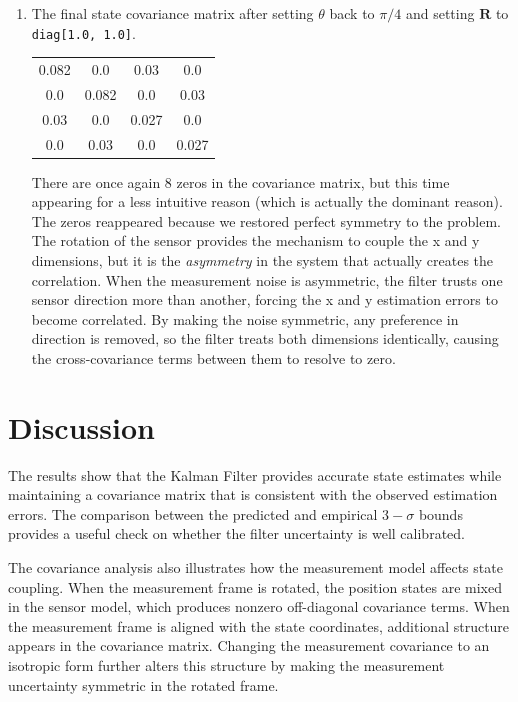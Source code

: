 \documentclass[11pt, letterpaper, twocolumn]{article}
\begin{document}
\begin{enumerate}
\item The final state covariance matrix after setting $\theta$ back 
    to $\pi/4$ and setting $\bm{R}$ to \texttt{diag[1.0, 1.0]}. 

    \begin{center}
        \begin{tabular}{cccc}
            \hline
            0.082 & 0.0 & 0.03 & 0.0 \\
            0.0 & 0.082 & 0.0 & 0.03 \\
            0.03 & 0.0 & 0.027 & 0.0 \\
            0.0 & 0.03 & 0.0 & 0.027 \\
            \hline
        \end{tabular}
    \end{center}
    There are once again 8 zeros in the covariance matrix, but this time
    appearing for a less intuitive reason (which is actually the dominant
    reason). The zeros reappeared because we restored perfect symmetry to 
    the problem. The rotation of the sensor provides the mechanism to
    couple the x and y dimensions, but it is the \textit{asymmetry} in the
    system that actually creates the correlation. When the measurement noise 
    is asymmetric, the filter trusts one sensor direction more than another,
    forcing the x and y estimation errors to become correlated. By making the
    noise symmetric, any preference in direction is removed, so the filter
    treats both dimensions identically, causing the cross-covariance terms
    between them to resolve to zero.

\end{enumerate}

\section*{Discussion}

The results show that the Kalman Filter provides accurate state estimates while
maintaining a covariance matrix that is consistent with the observed estimation
errors. The comparison between the predicted and empirical $3-\sigma$ bounds 
provides a useful check on whether the filter uncertainty is well calibrated.

The covariance analysis also illustrates how the measurement model affects state
coupling. When the measurement frame is rotated, the position states are mixed
in the sensor model, which produces nonzero off-diagonal covariance terms. When
the measurement frame is aligned with the state coordinates, additional structure
appears in the covariance matrix. Changing the measurement covariance to an 
isotropic form further alters this structure by making the measurement uncertainty
symmetric in the rotated frame.
\end{document}
